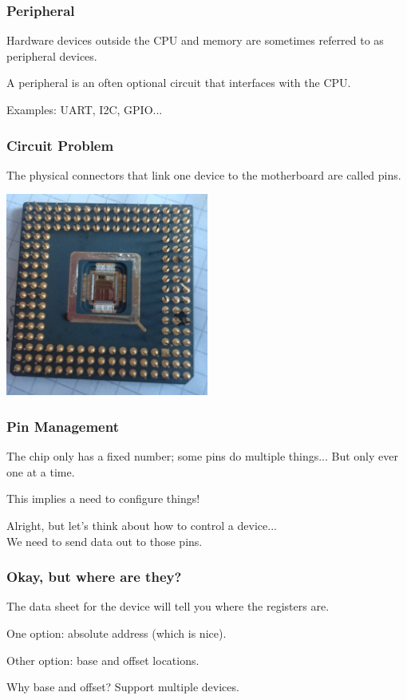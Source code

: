 \begin{frame}
\frametitle{Peripheral}

Hardware devices outside the CPU and memory are sometimes referred to as peripheral devices.

A peripheral is an often optional circuit that interfaces with the CPU.

Examples: UART, I2C, GPIO...

\end{frame}


\begin{frame}
\frametitle{Circuit Problem}

The physical connectors that link one device to the motherboard are called pins.

\begin{center}
	\includegraphics[width=0.5\textwidth]{images/686-cpu.jpg}
\end{center}


\end{frame}


\begin{frame}
\frametitle{Pin Management}

The chip only has a fixed number; some pins do multiple things...
\quad But only ever one at a time.

This implies a need to configure things!

Alright, but let's think about how to control a device...\\
\quad We need to send data out to those pins.

\end{frame}


\begin{frame}
\frametitle{Okay, but where are they?}

The data sheet for the device will tell you where the registers are.

One option: absolute address (which is nice).

Other option: base and offset locations.

Why base and offset? Support multiple devices.


\end{frame}


